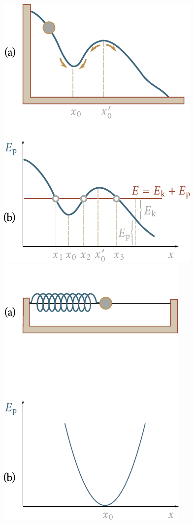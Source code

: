 \begin{figure}[t]
	\begin{minipage}[t]{0.5\linewidth}
		\begin{center}
			\includegraphics[scale=0.95]{figures/ch_03/fig_3_14.pdf}
			\caption[]{}
			\label{fig:3_14}
		\end{center}
	\end{minipage}
	\hspace{-0.05cm}
	\begin{minipage}[t]{0.5\linewidth}
		\begin{center}
			\includegraphics[scale=0.95]{figures/ch_03/fig_3_15.pdf}

\end{center}
\end{minipage}
\end{figure}
